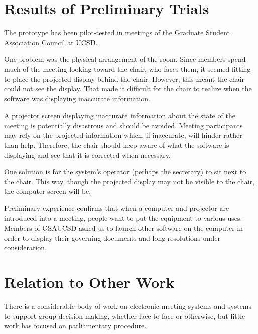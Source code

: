 \documentclass{book}
\begin{document}
\section{Results of Preliminary Trials}  %


The prototype has been pilot-tested in meetings of the Graduate Student Association Council at UCSD. 

One problem was the physical arrangement of the room. Since members spend much of the meeting looking toward the chair, who faces them, it seemed fitting to place the projected display behind the chair. However, this meant the chair could not see the display. That made it difficult for the chair to realize when the software was displaying inaccurate information.

A projector screen displaying inaccurate information about the state of the meeting is potentially disastrous and should be avoided. Meeting participants may rely on the projected information which, if inaccurate, will hinder rather than help. Therefore, the chair should keep aware of what the software is displaying and see that it is corrected when necessary.

One solution is for the system's operator (perhaps the secretary) to sit next to the chair. This way, though the projected display may not be visible to the chair, the computer screen will be. 

Preliminary experience confirms that when a computer and projector are introduced into a meeting, people want to put the equipment to various uses. Members of GSAUCSD asked us to launch other software on the computer in order to display their governing documents and long resolutions under consideration.


\section{Relation to Other Work}  %

There is a considerable body of work on electronic meeting systems and systems to support group decision making, whether face-to-face or otherwise, but little work has focused on parliamentary procedure.

\end{document}
